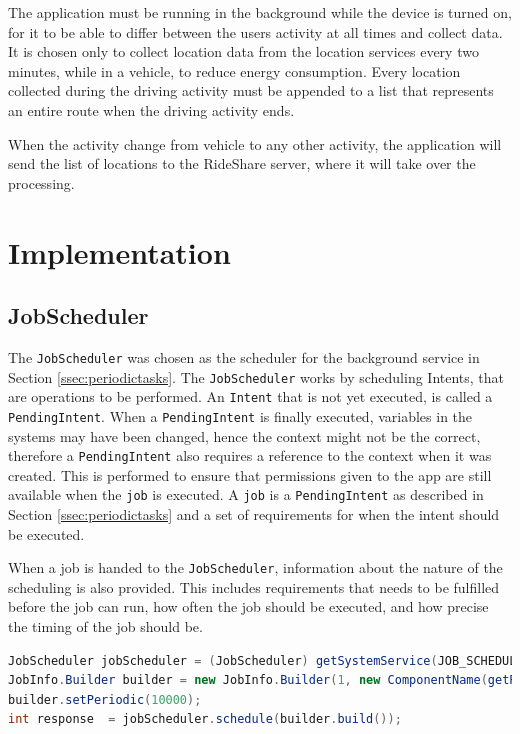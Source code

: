 The application must be running in the background while the device is turned on, for it to be able to differ between the users activity at all times and collect data. 
It is chosen only to collect location data from the location services every two minutes, while in a vehicle, to reduce energy consumption. 
Every location collected during the driving activity must be appended to a list that represents an entire route when the driving activity ends.

When the activity change from vehicle to any other activity, the application will send the list of locations to the RideShare server, where it will take over the processing. 
\section{Implementation}

\subsection{JobScheduler}
The \texttt{JobScheduler} was chosen as the scheduler for the background service in Section \ref{ssec:periodictasks}.
The \texttt{JobScheduler} works by scheduling Intents, that are operations to be performed. %
An \texttt{Intent} that is not yet executed, is called a \texttt{PendingIntent}.
When a \texttt{PendingIntent} is finally executed, variables in the systems may have been changed, hence the context might not be the correct, therefore a \texttt{PendingIntent} also requires a reference to the context when it was created.
This is performed to ensure that permissions given to the app are still available when the \texttt{job} is executed.
A \texttt{job} is a \texttt{PendingIntent} as described in Section \ref{ssec:periodictasks} and a set of requirements for when the intent should be executed.

When a job is handed to the \texttt{JobScheduler}, information about the nature of the scheduling is also provided.
This includes requirements that needs to be fulfilled before the job can run, how often the job should be executed, and how precise the timing of the job should be.


\begin{lstlisting}[language=Java, label=jobScheduler, caption=The implementation of jobScheduler.]
JobScheduler jobScheduler = (JobScheduler) getSystemService(JOB_SCHEDULER_SERVICE);
JobInfo.Builder builder = new JobInfo.Builder(1, new ComponentName(getPackageName(), RideShareService.class.getName()));
builder.setPeriodic(10000);
int response  = jobScheduler.schedule(builder.build());	
\end{lstlisting}

